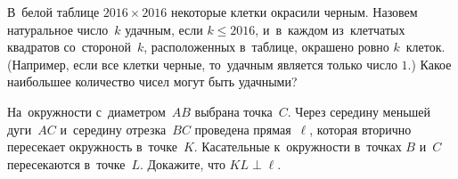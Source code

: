 \begin{problems}

\item
В~белой таблице $2016 \times 2016$ некоторые клетки окрасили черным.
Назовем натуральное число~$k$ удачным, если $k \leq 2016$, и~в~каждом
из~клетчатых квадратов со~стороной~$k$, расположенных в~таблице, окрашено ровно
$k$~клеток.
(Например, если все клетки черные, то~удачным является только число $1$.)
Какое наибольшее количество чисел могут быть удачными?


\item
На~окружности с~диаметром~$AB$ выбрана точка~$C$.
Через середину меньшей дуги~$AC$ и~середину отрезка~$BC$ проведена
прямая~$\ell$, которая вторично пересекает окружность в~точке~$K$.
Касательные к~окружности в~точках $B$ и~$C$ пересекаются в~точке~$L$.
Докажите, что $KL \perp \ell$.



\end{problems}

